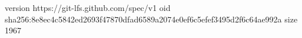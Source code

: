 version https://git-lfs.github.com/spec/v1
oid sha256:8e8ec4c5842ed2693f47870dfad6589a2074e0ef6c5efef3495d2f6c64ae992a
size 1967
